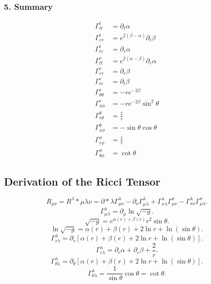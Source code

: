 \documentclass[11pt, a4paper]{report}
\begin{document}
\subsubsection*{5. Summary}
\begin{align}
\Gamma^t_{tt} &= \partial_t \alpha \\
\Gamma^t_{rr} &= e^{2(\beta - \alpha)} \partial_t \beta \\
\Gamma^t_{tr} &= \partial_r \alpha \\
\Gamma^r_{tt} &= e^{2(\alpha - \beta)} \partial_r \alpha \\
\Gamma^r_{rr} &= \partial_r \beta \\
\Gamma^r_{tr} &= \partial_t \beta \\
\Gamma^r_{\theta\theta} &= -r e^{-2\beta} \\
\Gamma^r_{\phi\phi} &= -r e^{-2\beta} \sin^2\theta \\
\Gamma^\theta_{r\theta} &= \frac{1}{r} \\
\Gamma^\theta_{\phi\phi} &= -\sin\theta \cos\theta \\
\Gamma^\phi_{r\phi} &= \frac{1}{r} \\
\Gamma^\phi_{\theta\phi} &= \cot\theta
\end{align}

\subsection{Derivation of the Ricci Tensor}
\begin{equation}
R_{\mu\nu} = {R^\lambda}*{\mu\lambda\nu} = \partial*\lambda \Gamma^\lambda_{\mu\nu} - \partial_\nu \Gamma^\lambda_{\mu\lambda} + \Gamma^\lambda_{\sigma\lambda} \Gamma^\sigma_{\mu\nu} - \Gamma^\lambda_{\sigma\nu} \Gamma^\sigma_{\mu\lambda}.
\end{equation}
\begin{equation}
\Gamma^\lambda_{\mu\lambda} = \partial_\mu \ln \sqrt{-g}.
\end{equation}
\begin{equation}
\sqrt{-g} = e^{\alpha(r) + \beta(r)} r^2 \sin\theta.
\end{equation}
\begin{equation}
\ln \sqrt{-g} = \alpha(r) + \beta(r) + 2\ln r + \ln(\sin\theta).
\end{equation}
\begin{equation}
\Gamma^\lambda_{r\lambda} = \partial_r \left[ \alpha(r) + \beta(r) + 2\ln r + \ln(\sin\theta) \right].
\end{equation}
\begin{equation}
\Gamma^\lambda_{r\lambda} = \partial_r\alpha + \partial_r\beta + \frac{2}{r}.
\end{equation}
\begin{equation}
\Gamma^\lambda_{\theta\lambda} = \partial_\theta \left[ \alpha(r) + \beta(r) + 2\ln r + \ln(\sin\theta) \right].
\end{equation}
\begin{equation}
\Gamma^\lambda_{\theta\lambda} = \frac{1}{\sin\theta} \cos\theta = \cot\theta.
\end{equation}
\end{document}
